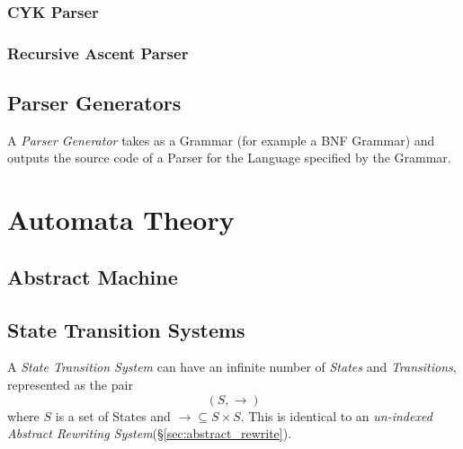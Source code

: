 \subsubsection{CYK Parser}

\subsubsection{Recursive Ascent Parser}



\subsection{Parser Generators}\label{sec:parser_generator}

A \emph{Parser Generator} takes as a Grammar (for example a BNF
Grammar) and outputs the source code of a Parser for the Language
specified by the Grammar.



\section{Automata Theory}\label{sec:automata_theory}

\subsection{Abstract Machine} \label{sec:abstract_machine}

\subsection{State Transition Systems} \label{sec:state_transition_system}

A \emph{State Transition System} can have an infinite number of
\emph{States} and \emph{Transitions}, represented as the pair
\[
    (S,\rightarrow)
\]
where $S$ is a set of States and $\rightarrow \subseteq S \times S$.
This is identical to an \emph{un-indexed Abstract Rewriting
  System}(\S\ref{sec:abstract_rewrite}).

